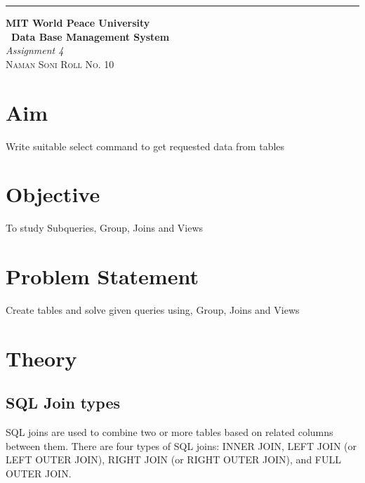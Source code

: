 \documentclass{article}
\begin{document}
	\begin{titlepage} %
		
		\raggedleft\rule{1pt}{\textheight} %
		\hspace{0.05\textwidth} %
		\parbox[b]{0.75\textwidth}
		{ %
			
			{\Huge\bfseries MIT World Peace University \\[0.5\baselineskip] \ Data Base Management System}\\[2\baselineskip] %
			{\large\textit{Assignment 4}}\\[4\baselineskip] %
			{\Large\textsc{Naman Soni Roll No. 10}} %
			
			\vspace{0.5\textheight} %
		}
		
\end{titlepage}
\tableofcontents
\pagebreak
\section{\textbf{Aim}}
Write suitable select command to get requested data from tables
\section{\textbf{Objective}}
To study Subqueries, Group, Joins and Views
\section{\textbf{Problem Statement}}
Create tables and solve given queries using, Group, Joins and Views
\section{\textbf{Theory}}
\subsection{\textbf{SQL Join types}}
SQL joins are used to combine two or more tables based on related columns between them. There are four types of SQL joins: INNER JOIN, LEFT JOIN (or LEFT OUTER JOIN), RIGHT JOIN (or RIGHT OUTER JOIN), and FULL OUTER JOIN.\\
\end{document}
